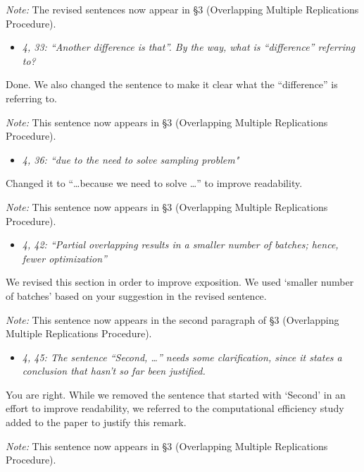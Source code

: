 \documentclass[11pt,notitlepage,onecolumn]{article}
\newcommand{\noi}{\noindent}
\begin{document}
\noi
{\it Note:}
The revised sentences now appear in \S 3 (Overlapping Multiple Replications Procedure). 
\medskip 

\begin{itemize}
\item[] \textit{4, 33: ``Another difference is that''. By the way, what is ``difference'' referring to?}
\end{itemize}

\noi
Done.
We also changed the sentence to make it clear what the ``difference'' is referring to. 
\medskip 

\noi
{\it Note:}
This sentence now appears in \S 3 (Overlapping Multiple Replications Procedure). 
\medskip 

\begin{itemize}
\item[] \textit{4, 36: ``due to the need to solve sampling problem"}
\end{itemize}

\noi
Changed it to ``\dots because we need to solve \ldots '' to improve readability.  
\medskip 

\noi
{\it Note:}
This sentence now appears in \S 3 (Overlapping Multiple Replications Procedure). 
\medskip 

\begin{itemize}
\item[] \textit{4, 42: ``Partial overlapping results in a smaller number of batches; hence, fewer optimization''}
\end{itemize}

\noi
We revised this section in order to improve exposition. 
We used `smaller number of batches' based on your suggestion in the revised sentence. 
\medskip 

\noi 
{\it Note:} This sentence now appears in the second paragraph of \S 3 (Overlapping Multiple Replications Procedure). 
\medskip 


\begin{itemize}
\item[] \textit{4, 45: The sentence ``Second, \ldots '' needs some clarification, since it states a conclusion that hasn't so far been justified.}
\end{itemize}

\noi
You are right. 
While we removed the sentence that started with `Second' in an effort to improve readability, we referred to the computational efficiency study added to the paper to justify this remark.   
\medskip 

\noi
{\it Note:}
This sentence now appears in \S 3 (Overlapping Multiple Replications Procedure). 
\medskip 
\end{document}
